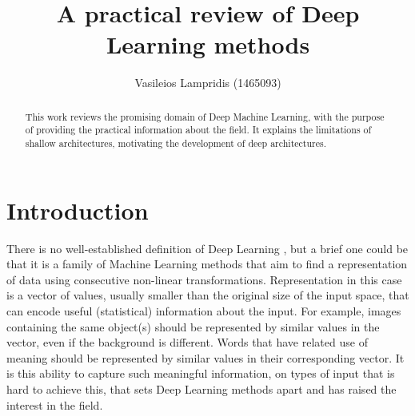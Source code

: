 \documentclass[a4paper]{article}
\author{Vasileios Lampridis	(1465093)}
\title{A practical review of Deep Learning methods}
\begin{document}
	
\tableofcontents
\listoffigures
\newpage

\maketitle
\listoftodos
\begin{abstract}
	This work reviews the promising domain of Deep Machine Learning, with the purpose of providing the practical information about the field. It explains the limitations of shallow architectures, motivating the development of deep architectures.
\end{abstract}

\section{Introduction}
	There is no well-established definition of Deep Learning , but a brief one could be that it is a family of Machine Learning methods that aim to find a representation of data using consecutive non-linear transformations. Representation in this case is a vector of values, usually smaller than the original size of the input space, that can encode useful (statistical) information about the input. For example, images containing the same object(s) should be represented by similar values in the vector, even if the background is different. Words that have related use of meaning should be represented by similar values in their corresponding vector. It is this ability to capture such meaningful information, on types of input that is hard to achieve this, that sets Deep Learning methods apart and has raised the interest in the field.
	
\end{document}
